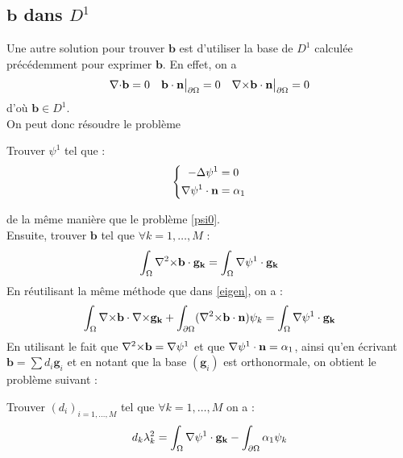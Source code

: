 \subsection{$\mathbf{b}$ dans $D^1$}
Une autre solution pour trouver $\mathbf{b}$ est d'utiliser la base de $D^1$ calculée précédemment pour exprimer $\mathbf{b}$. En effet, on a
\[ {\nabla\cdot}\mathbf{b}=0\quad \mathbf{b}\cdot\mathbf{n}{\big\rvert_{\partial\Omega}}=0\quad {\nabla\times}\mathbf{b}\cdot\mathbf{n}{\big\rvert_{\partial\Omega}}=0\]
d'où $\mathbf{b}\in D^1$.\\
On peut donc résoudre le problème
\begin{pb}
Trouver $\psi^1$ tel que :
\begin{equation*}
\left\{ \begin{aligned}
-{\Delta}\psi^1 &= 0\\
{\nabla}\psi^1\cdot\mathbf{n} &= \alpha_1
\end{aligned}\right. \end{equation*}\end{pb}
de la même manière que le problème \ref{psi0}.\\
Ensuite, trouver $\mathbf{b}$ tel que $\forall k=1,\dots,M$ :
\[ \int_\Omega {\nabla^2\times}\mathbf{b}\cdot\mathbf{g_k} = \int_\Omega {\nabla}\psi^1\cdot\mathbf{g_k} \]
En réutilisant la même méthode que dans \ref{eigen}, on a :
\[ \int_\Omega {\nabla\times}\mathbf{b}\cdot{\nabla\times}\mathbf{g_k} + \int_{\partial\Omega}({\nabla^2\times}\mathbf{b}\cdot\mathbf{n})\psi_k = \int_\Omega {\nabla}\psi^1\cdot\mathbf{g_k} \]
En utilisant le fait que ${\nabla^2\times}\mathbf{b}={\nabla}\psi^1$ et que ${\nabla}\psi^1\cdot\mathbf{n}=\alpha_1$, ainsi qu'en écrivant $\mathbf{b}=\sum d_i\mathbf{g}_i$ et en notant que la base $(\mathbf{g}_i)$ est orthonormale, on obtient le problème suivant :
\begin{pb}\label{pbbd1}
Trouver $(d_i)_{i=1,\dots,M}$ tel que $\forall k=1,\dots,M$ on a :
\[ d_k\lambda_k^2 = \int_\Omega {\nabla}\psi^1\cdot\mathbf{g_k} - \int_{\partial\Omega} \alpha_1\psi_k \]
\end{pb}


